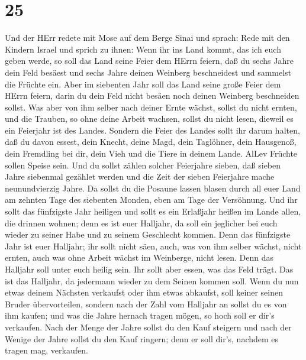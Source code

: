 \hypertarget{section-24}{%
\section{25}\label{section-24}}

 Und der HErr redete mit Mose auf dem Berge Sinai und
sprach:  Rede mit den Kindern Israel und sprich zu ihnen:
Wenn ihr ins Land kommt, das ich euch geben werde, so soll das Land
seine Feier dem HErrn feiern,  daß du sechs Jahre dein Feld
besäest und sechs Jahre deinen Weinberg beschneidest und sammelst die
Früchte ein.  Aber im siebenten Jahr soll das Land seine
große Feier dem HErrn feiern, darin du dein Feld nicht besäen noch
deinen Weinberg beschneiden sollst.  Was aber von ihm selber
nach deiner Ernte wächst, sollst du nicht ernten, und die Trauben, so
ohne deine Arbeit wachsen, sollst du nicht lesen, dieweil es ein
Feierjahr ist des Landes.  Sondern die Feier des Landes
sollt ihr darum halten, daß du davon essest, dein Knecht, deine Magd,
dein Taglöhner, dein Hausgenoß, dein Fremdling bei dir, 
dein Vieh und die Tiere in deinem Lande. AlLev Früchte sollen Speise
sein.  Und du sollst zählen solcher Feierjahre sieben, daß
sieben Jahre siebenmal gezählet werden und die Zeit der sieben
Feierjahre mache neunundvierzig Jahre.  Da sollst du die
Posaune lassen blasen durch all euer Land am zehnten Tage des siebenten
Monden, eben am Tage der Versöhnung.  Und ihr sollt das
fünfzigste Jahr heiligen und sollt es ein Erlaßjahr heißen im Lande
allen, die drinnen wohnen; denn es ist euer Halljahr, da soll ein
jeglicher bei euch wieder zu seiner Habe und zu seinem Geschlecht
kommen.  Denn das fünfzigste Jahr ist euer Halljahr; ihr
sollt nicht säen, auch, was von ihm selber wächst, nicht ernten, auch
was ohne Arbeit wächst im Weinberge, nicht lesen.  Denn das
Halljahr soll unter euch heilig sein. Ihr sollt aber essen, was das Feld
trägt.  Das ist das Halljahr, da jedermann wieder zu dem
Seinen kommen soll.  Wenn du nun etwas deinem Nächsten
verkaufst oder ihm etwas abkaufst, soll keiner seinen Bruder
übervorteilen,  sondern nach der Zahl vom Halljahr an
sollst du es von ihm kaufen; und was die Jahre hernach tragen mögen, so
hoch soll er dir's verkaufen.  Nach der Menge der Jahre
sollst du den Kauf steigern und nach der Wenige der Jahre sollst du den
Kauf ringern; denn er soll dir's, nachdem es tragen mag, verkaufen.
